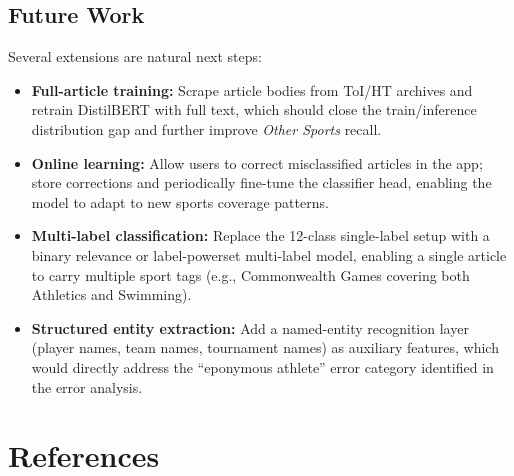 \documentclass[11pt,a4paper]{article}
\begin{document}
\subsection{Future Work}

Several extensions are natural next steps:
\begin{itemize}[noitemsep]
  \item \textbf{Full-article training:} Scrape article bodies from ToI/HT archives and retrain DistilBERT with full text, which should close the train/inference distribution gap and further improve \textit{Other Sports} recall.
  \item \textbf{Online learning:} Allow users to correct misclassified articles in the app; store corrections and periodically fine-tune the classifier head, enabling the model to adapt to new sports coverage patterns.
  \item \textbf{Multi-label classification:} Replace the 12-class single-label setup with a binary relevance or label-powerset multi-label model, enabling a single article to carry multiple sport tags (e.g., Commonwealth Games covering both Athletics and Swimming).
  \item \textbf{Structured entity extraction:} Add a named-entity recognition layer (player names, team names, tournament names) as auxiliary features, which would directly address the ``eponymous athlete'' error category identified in the error analysis.
\end{itemize}


\section{References}
\end{document}
